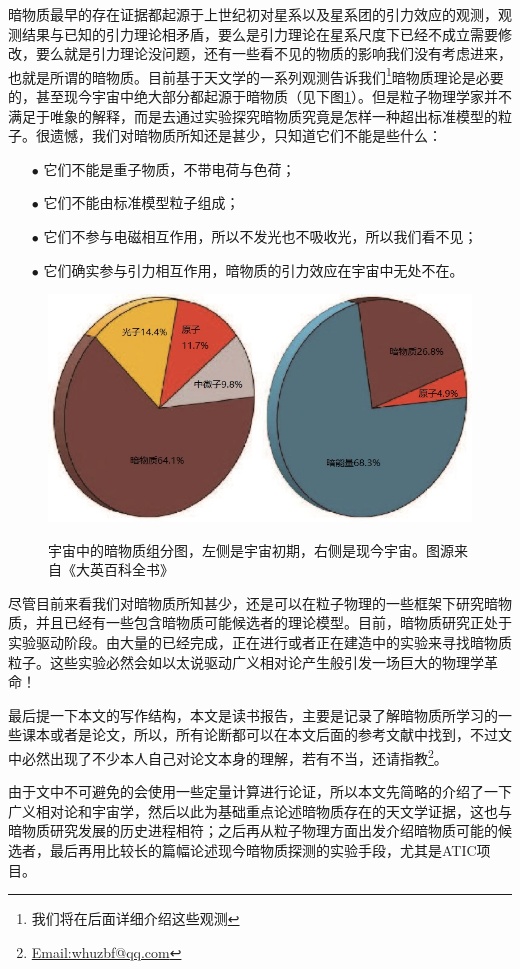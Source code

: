 \documentclass{ctexart}
\newcommand{\dotemph}[1]{\CJKunderdot{#1}}
\begin{document}
	暗物质最早的存在证据都起源于上世纪初对星系以及星系团的引力效应的观测，观测结果与已知的引力理论相矛盾，要么是引力理论在星系尺度下已经不成立需要修改，要么就是引力理论没问题，还有一些看不见的物质的影响我们没有考虑进来，也就是所谓的暗物质。目前基于天文学的一系列观测告诉我们\footnote{我们将在后面详细介绍这些观测}暗物质理论是必要的，甚至现今宇宙中绝大部分都起源于暗物质（见下图\ref{fig:2}）。但是粒子物理学家并不满足于唯象的解释，而是去通过实验探究暗物质究竟是怎样一种超出标准模型的粒子。很遗憾，我们对暗物质所知还是甚少，只知道它们不能是些什么：
	\begin{enumerate}
		\item[$\bullet$] 它们不能是重子物质，不带电荷与色荷；
		\item[$\bullet$] 它们不能由标准模型粒子组成；
		\item[$\bullet$] 它们不参与电磁相互作用，所以不发光也不吸收光，所以我们看不见；
		\item[$\bullet$] 它们确实参与引力相互作用，暗物质的引力效应在宇宙中无处不在。
	\end{enumerate}
	\begin{figure}[h]
		\centering
		\includegraphics[width = 0.7\linewidth]{figs/dark_matter.jpg}
		\label{fig:2}
		\caption{宇宙中的暗物质组分图，左侧是宇宙初期，右侧是现今宇宙。图源来自《大英百科全书》}
	\end{figure}
	尽管目前来看我们对暗物质所知甚少，还是可以在粒子物理的一些框架下研究暗物质，并且已经有一些包含暗物质可能候选者的理论模型。目前，暗物质研究正处于实验驱动阶段。由大量的已经完成，正在进行或者正在建造中的实验来寻找暗物质粒子。这些实验必然会如以太说驱动广义相对论产生般引发一场巨大的物理学革命！
	
	最后提一下本文的写作结构，本文是读书报告，主要是记录了解暗物质所学习的一些课本或者是论文，所以\dotemph{基本没有原创之处}，所有论断都可以在本文后面的参考文献中找到，不过文中必然出现了不少本人自己对论文本身的理解，若有不当，还请指教\footnote{\href{mailto: whuzbf@qq.com}{Email:whuzbf@qq.com}}。
		
	由于文中不可避免的会使用一些定量计算进行论证，所以本文先简略的介绍了一下广义相对论和宇宙学，然后以此为基础重点论述暗物质存在的天文学证据，这也与暗物质研究发展的历史进程相符；之后再从粒子物理方面出发介绍暗物质可能的候选者，最后再用比较长的篇幅论述现今暗物质探测的实验手段，尤其是ATIC项目。
	
\end{document}
